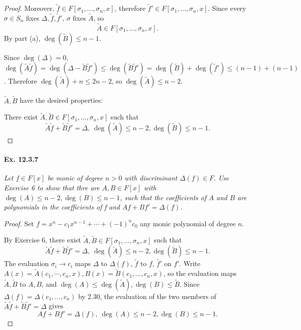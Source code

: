 \documentclass[11pt,a4paper]{article}
\begin{document}
\begin{proof}
Moreover, $\tilde{f} \in F[\sigma_1,\ldots,\sigma_n,x]$, therefore $\tilde{f}' \in F[\sigma_1,\ldots,\sigma_n,x]$. Since every $\sigma \in S_n$ fixes $\Delta, \tilde{f}, \tilde{f}'$, $\sigma$ fixes $\tilde{A}$, so
$$\tilde{A} \in F[\sigma_1,\ldots,\sigma_n,x].$$
By part (a), $\deg(\tilde{B}) \leq n-1$.

Since $\deg(\Delta) = 0$, $\deg(\tilde{A} \tilde{f}) = \deg(\Delta - \tilde{B} \tilde{f}') \leq \deg(\tilde{B} \tilde{f}' ) = \deg(\tilde{B}) + \deg(\tilde{f}') \leq (n-1) + (n-1)$. Therefore $\deg(\tilde{A}) + n \leq 2n -2$, so $\deg(\tilde{A}) \leq n-2$. 

$\tilde{A}, \tilde{B}$ have the desired properties:

There exist $\tilde{A}, \tilde{B} \in F[\sigma_1,\ldots,\sigma_n,x]$ such that
$$\tilde{A} \tilde{f} + \tilde{B} \tilde{f}' = \Delta,\ \deg(\tilde{A}) \leq n-2, \deg(\tilde{B}) \leq n-1.$$
\end{proof}

\paragraph{Ex. 12.3.7}

{\it Let $f \in F[x]$ be monic of degree $n>0$ with discriminant $\Delta(f) \in F$. Use Exercise 6 to show that thre are $A,B \in F[x]$ with $\deg(A) \leq n-2, \deg(B) \leq n- 1$, such that the coefficients of $A$ and $B$ are polynomials in the coefficients of f and $Af + B f' = \Delta(f)$.
}

\begin{proof}
Set $f = x^n - c_1 x^{n-1} + \cdots +(-1)^n c_0$ any monic polynomial of degree $n$.

By Exercise 6, there exist $\tilde{A}, \tilde{B} \in F[\sigma_1,\ldots,\sigma_n,x]$ such that
$$\tilde{A} \tilde{f} + \tilde{B} \tilde{f}' = \Delta,\ \deg(\tilde{A}) \leq n-2, \deg(\tilde{B}) \leq n-1.$$
The evaluation $\sigma_i \to c_i$ maps $\Delta$ to $\Delta(f)$, $\tilde{f}$ to $f$, $\tilde{f'}$ on $f'$. Write $A(x) = \tilde{A}(c_1,\cdots,c_n,x), B(x) =  \tilde{B}(c_1,\ldots,c_n,x)$, so the evaluation maps $\tilde{A}, \tilde{B}$ to $A,B$, and $\deg(A) \leq \deg(\tilde{A}), \deg(B) \leq \tilde{B}$. Since $\Delta(f) = \Delta(c_1,\ldots,c_n)$ by 2.30, the evaluation of the two members of  $\tilde{A} \tilde{f} + \tilde{B} \tilde{f}' = \Delta$ gives
$$Af + B f' = \Delta(f),\ \deg(A) \leq n-2, \deg(B) \leq n-1.$$

\end{proof}
\end{document}
